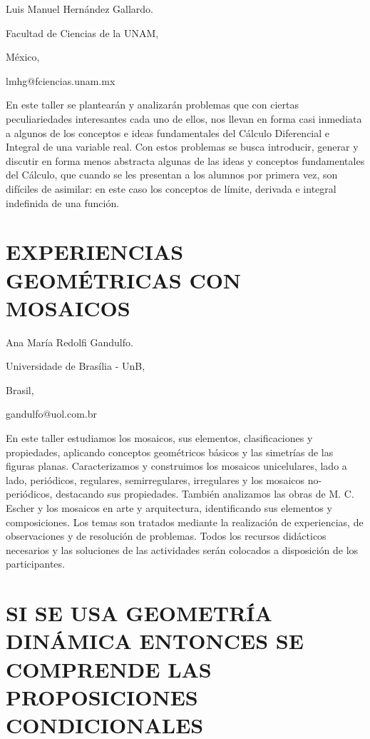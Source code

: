 \begin{datos}

Luis Manuel Hernández Gallardo. 

Facultad de Ciencias de la UNAM,

México,

lmhg@fciencias.unam.mx

\end{datos}

En este taller se plantearán y analizarán problemas que con ciertas
peculiariedades interesantes cada uno de ellos, nos llevan en forma
casi inmediata a algunos de los conceptos e ideas fundamentales del
Cálculo Diferencial e Integral de una variable real. Con estos problemas
se busca introducir, generar y discutir en forma menos abstracta algunas
de las ideas y conceptos fundamentales del Cálculo, que cuando se
les presentan a los alumnos por primera vez, son difíciles de asimilar:
en este caso los conceptos de límite, derivada e integral indefinida
de una función. 


\section{EXPERIENCIAS GEOMÉTRICAS CON MOSAICOS}

\begin{datos}

Ana María Redolfi Gandulfo.

Universidade de Brasília - UnB,

Brasil,

gandulfo@uol.com.br

\end{datos}

En este taller estudiamos los mosaicos, sus elementos, clasificaciones
y propiedades, aplicando conceptos geométricos básicos y las simetrías
de las figuras planas. Caracterizamos y construimos los mosaicos unicelulares,
lado a lado, periódicos, regulares, semirregulares, irregulares y
los mosaicos no-periódicos, destacando sus propiedades. También analizamos
las obras de M. C. Escher y los mosaicos en arte y arquitectura, identificando
sus elementos y composiciones. Los temas son tratados mediante la
realización de experiencias, de observaciones y de resolución de problemas.
Todos los recursos didácticos necesarios y las soluciones de las actividades
serán colocados a disposición de los participantes.


\section{SI SE USA GEOMETRÍA DINÁMICA ENTONCES SE COMPRENDE LAS PROPOSICIONES
CONDICIONALES }

